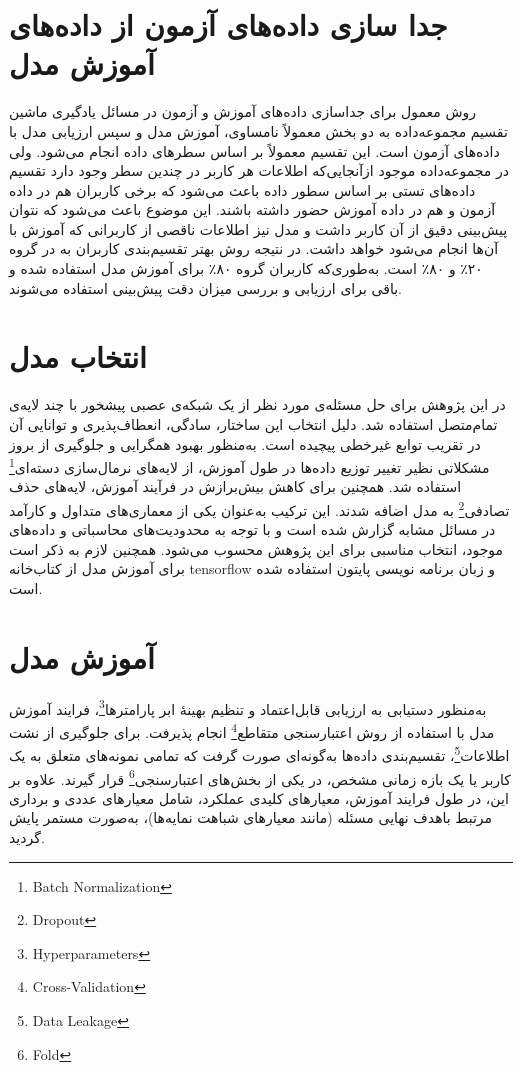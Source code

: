 \section{جدا سازی داده‌های آزمون از داده‌های آموزش مدل}
روش معمول برای جداسازی داده‌های آموزش و آزمون در مسائل یادگیری ماشین تقسیم مجموعه‌داده به دو بخش معمولاً نامساوی، آموزش مدل و سپس ارزیابی مدل با داده‌های آزمون است. این تقسیم معمولاً بر اساس سطرهای داده انجام می‌شود. ولی در مجموعه‌داده موجود ازآنجایی‌که اطلاعات هر کاربر در چندین سطر وجود دارد تقسیم داده‌های تستی بر اساس سطور داده باعث می‌شود که برخی کاربران هم در داده آزمون و هم در داده آموزش حضور داشته باشند. این موضوع باعث می‌شود که نتوان پیش‌بینی دقیق از آن کاربر داشت و مدل نیز اطلاعات ناقصی از کاربرانی که آموزش با آن‌ها انجام می‌شود خواهد داشت. در نتیجه روش بهتر تقسیم‌بندی کاربران به در گروه ۲۰٪ و ۸۰٪ است. به‌طوری‌که کاربران گروه ۸۰٪ برای آموزش مدل استفاده شده و باقی برای ارزیابی و بررسی میزان دقت پیش‌بینی استفاده می‌شوند.


\section{انتخاب مدل}
در این پژوهش برای حل مسئله‌ی مورد نظر از یک شبکه‌ی عصبی پیشخور با چند لایه‌ی تمام‌متصل استفاده شد. دلیل انتخاب این ساختار، سادگی، انعطاف‌پذیری و توانایی آن در تقریب توابع غیرخطی پیچیده است. به‌منظور بهبود همگرایی و جلوگیری از بروز مشکلاتی نظیر تغییر توزیع داده‌ها در طول آموزش، از لایه‌های نرمال‌سازی دسته‌ای\footnote{Batch Normalization} استفاده شد. همچنین برای کاهش بیش‌برازش  در فرآیند آموزش، لایه‌های حذف تصادفی\footnote{Dropout} به مدل اضافه شدند. این ترکیب به‌عنوان یکی از معماری‌های متداول و کارآمد در مسائل مشابه گزارش شده است و با توجه به محدودیت‌های محاسباتی و داده‌های موجود، انتخاب مناسبی برای این پژوهش محسوب می‌شود. همچنین لازم به ذکر است برای آموزش مدل از کتاب‌خانه tensorflow و زبان برنامه نویسی پایتون استفاده شده است.

\section{آموزش مدل}
به‌منظور دستیابی به ارزیابی قابل‌اعتماد و تنظیم بهینهٔ ابر پارامترها\footnote{Hyperparameters}، فرایند آموزش مدل با استفاده از روش اعتبارسنجی متقاطع\footnote{Cross-Validation} انجام پذیرفت. برای جلوگیری از نشت اطلاعات\footnote{Data Leakage}، تقسیم‌بندی داده‌ها به‌گونه‌ای صورت گرفت که تمامی نمونه‌های متعلق به یک کاربر یا یک بازه زمانی مشخص، در یکی از بخش‌های اعتبارسنجی\footnote{Fold} قرار گیرند. علاوه بر این، در طول فرایند آموزش، معیارهای کلیدی عملکرد، شامل معیارهای عددی و برداری مرتبط باهدف نهایی مسئله (مانند معیارهای شباهت نمایه‌ها)، به‌صورت مستمر پایش گردید.

